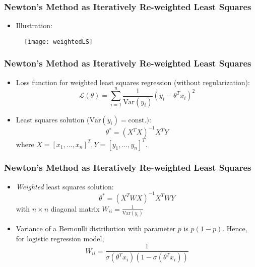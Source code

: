 \begin{frame}
\frametitle{Newton's Method as Iteratively Re-weighted Least Squares}
\begin{itemize}
\item Illustration:
\end{itemize}

\begin{figure}
\texttt{[image: weightedLS]}
\end{figure}
\end{frame}

\begin{frame}
\frametitle{Newton's Method as Iteratively Re-weighted Least Squares}
\begin{itemize}
\item Loss function for weighted least squares regression (without regularization):
\begin{equation}
\mathcal{L(\theta)} = \sum_{i=1}^n \frac{1}{\text{Var}(y_i)}(y_i - \theta^T x_i)^2
\end{equation}
\item Least squares solution ($\text{Var}(y_i) = \text{const.})$:
\begin{equation}
\theta^* = (X^TX)^{-1}X^TY
\end{equation}
where $X = [x_1,...,x_n]^T, Y = [y_1,...,y_n]^T$.
\end{itemize}
\end{frame}

\begin{frame}
\frametitle{Newton's Method as Iteratively Re-weighted Least Squares}
\begin{itemize}
\item \textit{Weighted} least squares solution:
\begin{equation}
\theta^* = (X^T WX)^{-1}X^T WY
\end{equation}
with $n \times n$ diagonal matrix $W_{ii} = \frac{1}{\text{Var}(y_i)}$
\item Variance of a Bernoulli distribution with parameter $p$ is $p(1-p)$. Hence, for logistic regression model,
\begin{equation}
W_{ii} = \frac{1}{\sigma (\theta^T x_i) (1 - \sigma (\theta^T x_i))}
\end{equation}
\end{itemize}
\end{frame}



